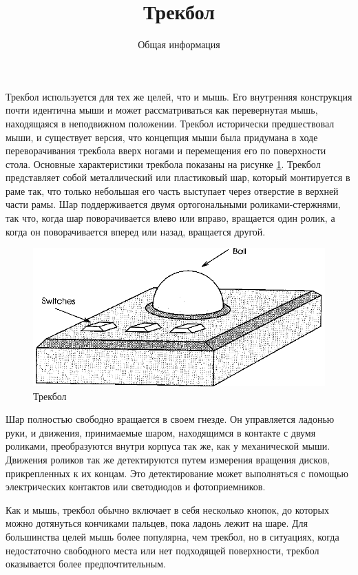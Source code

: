 \documentclass[11pt, a4paper]{article}
\begin{document}
\title{Трекбол}
\author{Общая информация}
\date{}
\maketitle

    Трекбол используется для тех же целей, что и мышь. Его внутренняя конструкция почти идентична мыши и может рассматриваться как перевернутая мышь, находящаяся в неподвижном положении. Трекбол исторически предшествовал мыши, и существует версия, что концепция мыши была придумана в ходе переворачивания трекбола вверх ногами и перемещения его по поверхности стола. Основные характеристики трекбола показаны на рисунке \ref{fig:theoryTrackballGeneric}. Трекбол представляет собой металлический или пластиковый шар, который монтируется в раме так, что только небольшая его часть выступает через отверстие в верхней части рамы. Шар поддерживается двумя ортогональными роликами-стержнями, так что, когда шар поворачивается влево или вправо, вращается один ролик, а когда он поворачивается вперед или назад, вращается другой.
    
    \begin{figure}[h]
        \centering
    \includegraphics[width=0.5\linewidth]{theory_track/2.3.png}
        \caption{Трекбол}
        \label{fig:theoryTrackballGeneric}
    \end{figure}
    
    Шар полностью свободно вращается в своем гнезде. Он управляется ладонью руки, и движения, принимаемые шаром, находящимся в контакте с двумя роликами, преобразуются внутри корпуса так же, как у механической мыши. Движения роликов так же детектируются путем измерения вращения дисков, прикрепленных к их концам. Это детектирование может выполняться с помощью электрических контактов или светодиодов и фотоприемников.
    
    Как и мышь, трекбол обычно включает в себя несколько кнопок, до которых можно дотянуться кончиками пальцев, пока ладонь лежит на шаре. Для большинства целей мышь более популярна, чем трекбол, но в ситуациях, когда недостаточно свободного места или нет подходящей поверхности, трекбол оказывается более предпочтительным.
\end{document}

